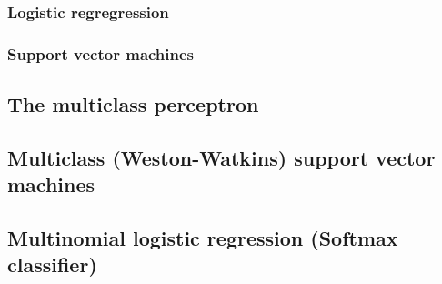 \subsubsection{Logistic regregression}
\subsubsection{Support vector machines}

\subsection{The multiclass perceptron}
\subsection{Multiclass (Weston-Watkins) support vector machines}
\subsection{Multinomial logistic regression (Softmax classifier)}

